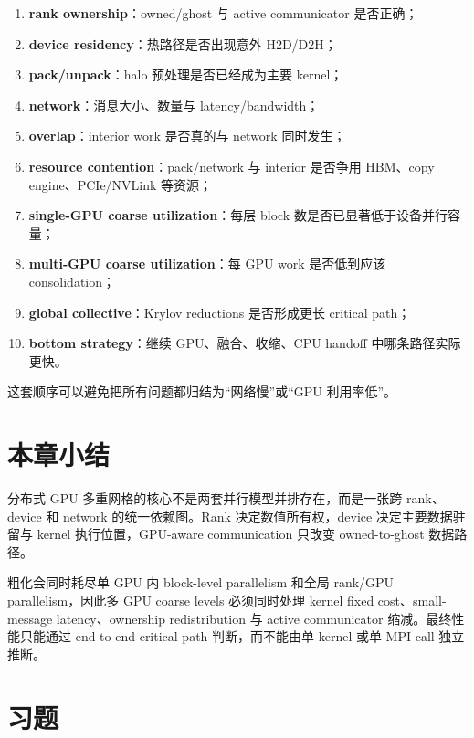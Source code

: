 \begin{enumerate}
\item \textbf{rank ownership}：owned/ghost 与 active communicator 是否正确；
\item \textbf{device residency}：热路径是否出现意外 H2D/D2H；
\item \textbf{pack/unpack}：halo 预处理是否已经成为主要 kernel；
\item \textbf{network}：消息大小、数量与 latency/bandwidth；
\item \textbf{overlap}：interior work 是否真的与 network 同时发生；
\item \textbf{resource contention}：pack/network 与 interior 是否争用 HBM、copy engine、PCIe/NVLink 等资源；
\item \textbf{single-GPU coarse utilization}：每层 block 数是否已显著低于设备并行容量；
\item \textbf{multi-GPU coarse utilization}：每 GPU work 是否低到应该 consolidation；
\item \textbf{global collective}：Krylov reductions 是否形成更长 critical path；
\item \textbf{bottom strategy}：继续 GPU、融合、收缩、CPU handoff 中哪条路径实际更快。
\end{enumerate}

这套顺序可以避免把所有问题都归结为“网络慢”或“GPU 利用率低”。

\section{本章小结}

分布式 GPU 多重网格的核心不是两套并行模型并排存在，而是一张跨 rank、device 和 network 的统一依赖图。Rank 决定数值所有权，device 决定主要数据驻留与 kernel 执行位置，GPU-aware communication 只改变 owned-to-ghost 数据路径。

粗化会同时耗尽单 GPU 内 block-level parallelism 和全局 rank/GPU parallelism，因此多 GPU coarse levels 必须同时处理 kernel fixed cost、small-message latency、ownership redistribution 与 active communicator 缩减。最终性能只能通过 end-to-end critical path 判断，而不能由单 kernel 或单 MPI call 独立推断。

\section*{习题}

